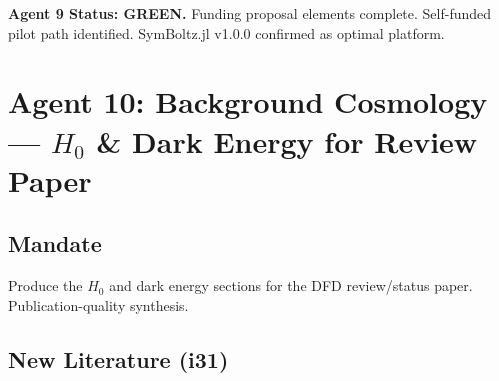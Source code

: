 \documentclass[11pt,a4paper]{article}
\newcommand{\GREEN}{\textcolor{dfdgreen}{\textbf{GREEN}}}
\begin{document}
\textbf{Agent 9 Status: \GREEN.} Funding proposal elements complete. Self-funded pilot path identified. SymBoltz.jl v1.0.0 confirmed as optimal platform.

\section{Agent 10: Background Cosmology --- $H_0$ \& Dark Energy for Review Paper}

\subsection{Mandate}
Produce the $H_0$ and dark energy sections for the DFD review/status paper. Publication-quality synthesis.

\subsection{New Literature (i31)}
\end{document}

